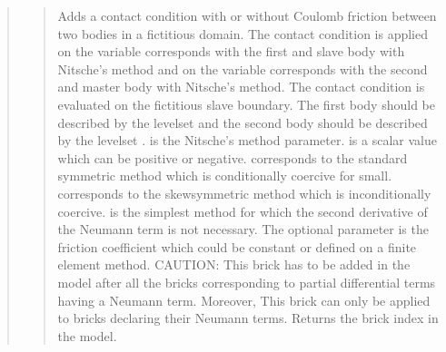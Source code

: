 \documentclass[a4paper,11pt,english]{sphinxmanual}
\begin{document}
\begin{quote}
\sphinxAtStartPar
{}
\begin{quote}

\sphinxAtStartPar
Adds a contact condition with or without Coulomb friction between
two bodies in a fictitious domain. The contact condition is applied on
the variable  corresponds with the first and slave body
with Nitsche’s method and on the variable  corresponds
with the second and master body with Nitsche’s method.
The contact condition is evaluated on the fictitious slave boundary.
The first body should be described by the level\sphinxhyphen{}set 
and the second body should be described by the level\sphinxhyphen{}set .
 is the Nitsche’s method parameter.
 is a scalar value which can be positive or negative.
 corresponds to the standard symmetric method which is
conditionally coercive for   small.
 corresponds to the skew\sphinxhyphen{}symmetric method which is inconditionally coercive.
 is the simplest method for which the second derivative of
the Neumann term is not necessary. The optional parameter 
is the friction coefficient which could be constant or defined on a finite element method.
CAUTION: This brick has to be added in the model after all the bricks
corresponding to partial differential terms having a Neumann term.
Moreover, This brick can only be applied to bricks declaring their
Neumann terms. Returns the brick index in the model.
\end{quote}

\sphinxAtStartPar
{}
\begin{quote}


\end{quote}
\end{quote}
\end{document}
